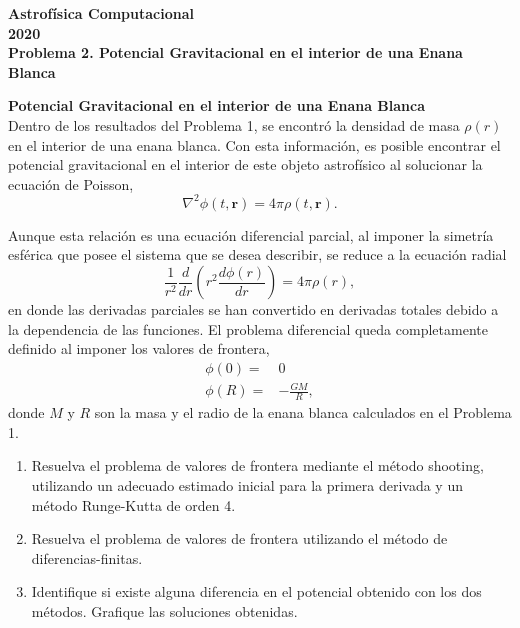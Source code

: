 \documentclass[11pt]{article}
\begin{document}
\begin{center}
\large \bf Astrofísica Computacional\rm \\
2020\\
{\small Problema 2. Potencial Gravitacional en el interior de una Enana Blanca}
\end{center}

 {\bf Potencial Gravitacional en el interior de una Enana Blanca} \\
 
Dentro de los resultados del Problema 1, se encontró la densidad de masa $\rho(r)$ en el interior de una enana blanca. Con esta información, es posible encontrar el potencial gravitacional en el interior de este objeto astrofísico al solucionar la ecuación de Poisson,
\begin{equation}
\nabla^2 \phi (t, \textbf{r})= 4 \pi \rho(t, \textbf{r}).
\end{equation}

Aunque esta relación es una ecuación diferencial parcial, al imponer la simetría esférica que posee el sistema que se desea describir, se reduce a la ecuación radial
\begin{equation}
 \frac{1}{r^2} \frac{d}{dr} \left( r^2 \dfrac{d\phi (r)}{dr} \right) = 4 \pi \rho (r),
 \end{equation} 
en donde las derivadas parciales se han convertido en derivadas totales debido a la dependencia de las funciones. El problema diferencial queda completamente definido al imponer los valores de frontera,
\begin{align}
 \phi (0) = &0 \\
 \phi ( R) = & -\frac{GM}{R},
 \end{align} 
donde $M$ y $R$ son la masa y el radio de la enana blanca calculados en el Problema 1. 

\begin{enumerate}
\item Resuelva el problema de valores de frontera mediante el método shooting, utilizando un adecuado estimado inicial para la primera derivada y un método Runge-Kutta de orden 4.

\item Resuelva el problema de valores de frontera utilizando el método de diferencias-finitas.

\item Identifique si existe alguna diferencia en el potencial obtenido con los dos métodos. Grafique las soluciones obtenidas.
\end{enumerate}
\end{document}
